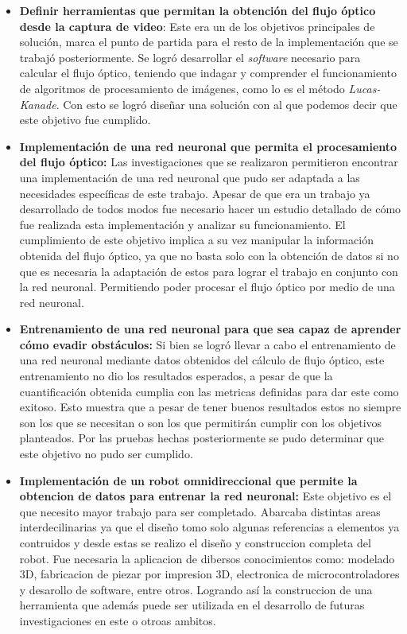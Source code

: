 \documentclass{iccmemoria}
\begin{document}
\begin{itemize}
	\item {\bf Definir herramientas que permitan la obtención del flujo óptico desde la captura de video}: Este era un de los objetivos principales de solución, marca el punto de partida para el resto de la implementación que se trabajó posteriormente. Se logró desarrollar el \emph{software} necesario para calcular el flujo óptico, teniendo que indagar y comprender el funcionamiento de algoritmos de procesamiento de imágenes, como lo es el método \emph{Lucas-Kanade}. Con esto se logró diseñar una solución con al que podemos decir que este objetivo fue cumplido.\\
	\item {\bf Implementación de una red neuronal que permita el procesamiento del flujo óptico:} Las investigaciones que se realizaron permitieron encontrar una implementación de una red neuronal que pudo ser adaptada a las necesidades específicas de este trabajo. Apesar de que era un trabajo ya desarrollado de todos modos fue necesario hacer un estudio detallado de cómo fue realizada esta implementación y analizar su funcionamiento. El cumplimiento de este objetivo implica a su vez manipular la información obtenida del flujo óptico, ya que no basta  solo con la obtención de datos si no que es necesaria la adaptación de estos para lograr el trabajo en conjunto con la red neuronal. Permitiendo poder procesar el flujo óptico por medio de una red neuronal.\\
	\item {\bf Entrenamiento de una red neuronal para que sea capaz de aprender cómo evadir obstáculos:} Si bien se logró llevar a cabo el entrenamiento de una red neuronal mediante datos obtenidos del cálculo de flujo óptico, este entrenamiento no dio los resultados esperados, a pesar de que la cuantificación obtenida cumplia con las metricas definidas para dar este como exitoso. Esto muestra que a pesar de tener buenos resultados estos no siempre son los que se necesitan o son los que permitirán cumplir con los objetivos planteados. Por las pruebas hechas posteriormente se pudo determinar que este objetivo no pudo ser cumplido.\\
	\item {\bf Implementación de un robot omnidireccional que permite la obtencion de datos para entrenar la red neuronal:} Este objetivo es el que necesito mayor trabajo para ser completado. Abarcaba distintas areas interdecilinarias ya que el diseño tomo solo algunas referencias a elementos ya contruidos y desde estas se realizo el diseño y construccion completa del robot. Fue necesaria la aplicacion de dibersos conocimientos como: modelado 3D, fabricacion de piezar por impresion 3D, electronica de microcontroladores y desarollo de software, entre otros. Logrando así la construccion de una herramienta que además puede ser utilizada en el desarrollo de futuras investigaciones en este o otroas ambitos.\\

\end{itemize}
\end{document}
